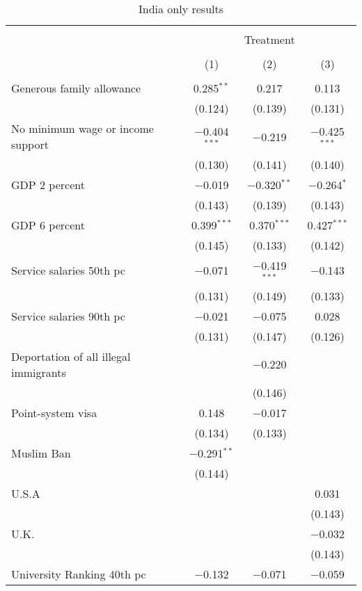 
\begin{table}[!htbp] \centering 
  \caption{India only results} 
  \label{tab:india} 
\begin{tabular}{@{\extracolsep{5pt}}lccc} 
\\[-1.8ex]\hline 
\hline \\[-1.8ex] 
 & \multicolumn{3}{c}{Treatment} \\ 
\cline{2-4} 
\\[-1.8ex] & (1) & (2) & (3)\\ 
\hline \\[-1.8ex] 
 Generous family allowance & 0.285$^{**}$ & 0.217 & 0.113 \\ 
  & (0.124) & (0.139) & (0.131) \\ 
  No minimum wage or income support & $-$0.404$^{***}$ & $-$0.219 & $-$0.425$^{***}$ \\ 
  & (0.130) & (0.141) & (0.140) \\ 
  GDP 2 percent & $-$0.019 & $-$0.320$^{**}$ & $-$0.264$^{*}$ \\ 
  & (0.143) & (0.139) & (0.143) \\ 
  GDP 6 percent & 0.399$^{***}$ & 0.370$^{***}$ & 0.427$^{***}$ \\ 
  & (0.145) & (0.133) & (0.142) \\ 
  Service salaries 50th pc & $-$0.071 & $-$0.419$^{***}$ & $-$0.143 \\ 
  & (0.131) & (0.149) & (0.133) \\ 
  Service salaries 90th pc & $-$0.021 & $-$0.075 & 0.028 \\ 
  & (0.131) & (0.147) & (0.126) \\ 
  Deportation of all illegal immigrants &  & $-$0.220 &  \\ 
  &  & (0.146) &  \\ 
  Point-system visa & 0.148 & $-$0.017 &  \\ 
  & (0.134) & (0.133) &  \\ 
  Muslim Ban & $-$0.291$^{**}$ &  &  \\ 
  & (0.144) &  &  \\ 
  U.S.A &  &  & 0.031 \\ 
  &  &  & (0.143) \\ 
  U.K. &  &  & $-$0.032 \\ 
  &  &  & (0.143) \\ 
  University Ranking 40th pc & $-$0.132 & $-$0.071 & $-$0.059 \\ 

\end{tabular}
\end{table}
